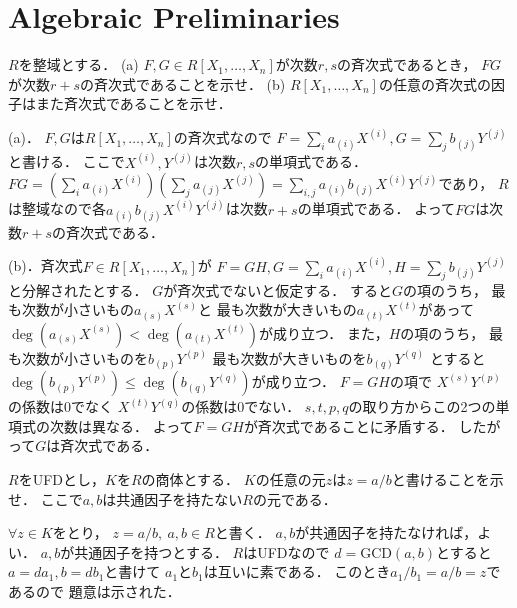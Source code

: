 \section{Algebraic Preliminaries}
\begin{prob}
  $R$を整域とする．
  (a) $F,G\in R[X_1, \dots ,X_n]$が次数$r,s$の斉次式であるとき，
  $FG$が次数$r+s$の斉次式であることを示せ．
  (b) $R[X_1, \dots ,X_n]$の任意の斉次式の因子はまた斉次式であることを示せ．
\end{prob}
\begin{ans}
  (a)．
  $F,G$は$R[X_1, \dots ,X_n]$の斉次式なので
  $F = \sum_i a_{(i)} X^{(i)}, G = \sum_j b_{(j)} Y^{(j)}$と書ける．
  ここで$X^{(i)}, Y^{(j)}$は次数$r,s$の単項式である．
  $FG = ( \sum_i a_{(i)} X^{(i)} ) ( \sum_j a_{(j)} X^{(j)} )
  = \sum_{i,j} a_{(i)} b_{(j)} X^{(i)} Y^{(j)}$であり，
  $R$は整域なので各$a_{(i)} b_{(j)} X^{(i)}Y^{(j)}$は次数$r+s$の単項式である．
  よって$FG$は次数$r+s$の斉次式である．

  (b)．斉次式$F \in R[X_1, \dots ,X_n]$が
  $F = GH, G = \sum_{i} a_{(i)} X^{(i)}, H = \sum_{j} b_{(j)} Y^{(j)}$
  と分解されたとする．
  $G$が斉次式でないと仮定する．
  すると$G$の項のうち，
  最も次数が小さいもの$a_{(s)}X^{(s)}$と
  最も次数が大きいもの$a_{(t)}X^{(t)}$があって
  $\deg(a_{(s)}X^{(s)}) < \deg(a_{(t)}X^{(t)})$が成り立つ．
  また，$H$の項のうち，
  最も次数が小さいものを$b_{(p)}Y^{(p)}$
  最も次数が大きいものを$b_{(q)}Y^{(q)}$
  とすると
  $\deg(b_{(p)}Y^{(p)}) \le \deg(b_{(q)}Y^{(q)})$が成り立つ．
  $F=GH$の項で
  $X^{(s)}Y^{(p)}$の係数は$0$でなく
  $X^{(t)}Y^{(q)}$の係数は$0$でない．
  $s,t,p,q$の取り方からこの2つの単項式の次数は異なる．
  よって$F = GH$が斉次式であることに矛盾する．
  したがって$G$は斉次式である．
\end{ans}

\begin{prob}
  $R$をUFDとし，$K$を$R$の商体とする．
  $K$の任意の元$z$は$z=a/b$と書けることを示せ．
  ここで$a,b$は共通因子を持たない$R$の元である．
\end{prob}
\begin{ans}
  $\forall z \in K$をとり，
  $z = a/b, \ a,b \in R$と書く．
  $a,b$が共通因子を持たなければ，よい．
  $a,b$が共通因子を持つとする．
  $R$はUFDなので
  $d = \mathrm{GCD}(a,b)$とすると
  $a = da_1, b = db_1$と書けて
  $a_1$と$b_1$は互いに素である．
  このとき$a_1/b_1 = a/b = z$であるので
  題意は示された．
\end{ans}

